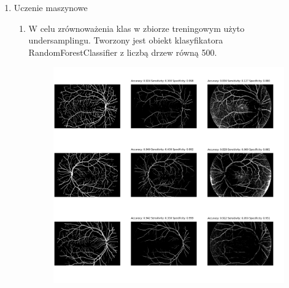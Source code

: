 \documentclass{article}
\begin{document}
\begin{enumerate}
\begin{enumerate}
                    \newpage
              \item Uczenie maszynowe
                    \begin{enumerate}
                        \item W celu zrównoważenia klas w zbiorze treningowym użyto undersamplingu. Tworzony
                              jest obiekt klasyfikatora RandomForestClassifier z liczbą drzew równą 500.
                              \begin{figure}[h]
                                \centering
                                \begin{minipage}{\textwidth}
                                    \centering
                                    \includegraphics[width=\linewidth]{../res/predicted-images.png}
                                \end{minipage}
                            \end{figure}
                    \end{enumerate}
          \end{enumerate}
\end{enumerate}
\end{document}
